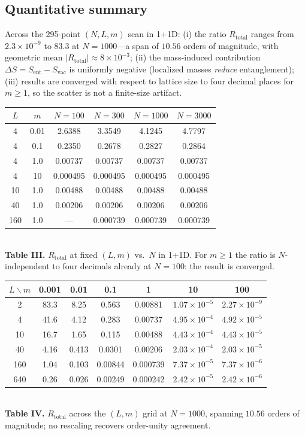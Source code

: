\documentclass[11pt]{article}
\newcommand{\Sent}{S_{\mathrm{ent}}}
\newcommand{\Svac}{S_{\mathrm{vac}}}
\newcommand{\Rtot}{R_{\mathrm{total}}}
\begin{document}
\subsection{Quantitative summary}
Across the 295-point $(N,L,m)$ scan in 1+1D: (i) the ratio $\Rtot$ ranges from $2.3\times 10^{-9}$ to
$83.3$ at $N=1000$---a span of $10.56$ orders of magnitude, with geometric mean $|\Rtot|\approx
8\times 10^{-3}$; (ii) the mass-induced contribution $\Delta S = \Sent - \Svac$ is uniformly negative
(localized masses \emph{reduce} entanglement); (iii) results are converged with respect to lattice size
to four decimal places for $m\ge 1$, so the scatter is not a finite-size artifact.
\begin{center}
\begin{tabular}{cccccc}
\toprule
$L$ & $m$ & $N=100$ & $N=300$ & $N=1000$ & $N=3000$ \\
\midrule
4   & 0.01 & 2.6388 & 3.3549 & 4.1245 & 4.7797 \\
4   & 0.1  & 0.2350 & 0.2678 & 0.2827 & 0.2864 \\
4   & 1.0  & 0.00737 & 0.00737 & 0.00737 & 0.00737 \\
4   & 10   & 0.000495 & 0.000495 & 0.000495 & 0.000495 \\
10  & 1.0  & 0.00488 & 0.00488 & 0.00488 & 0.00488 \\
40  & 1.0  & 0.00206 & 0.00206 & 0.00206 & 0.00206 \\
160 & 1.0  & --- & 0.000739 & 0.000739 & 0.000739 \\
\bottomrule
\end{tabular}
\\[2pt]
{\small \textbf{Table III.} $\Rtot$ at fixed $(L,m)$ vs.\ $N$ in 1+1D. For $m\ge 1$ the ratio is
$N$-independent to four decimals already at $N=100$: the result is converged.}
\end{center}
\begin{center}
\begin{tabular}{ccccccc}
\toprule
$L\backslash m$ & 0.001 & 0.01 & 0.1 & 1 & 10 & 100 \\
\midrule
2   & 83.3 & 8.25 & 0.563 & 0.00881 & $1.07{\times}10^{-5}$ & $2.27{\times}10^{-9}$ \\
4   & 41.6 & 4.12 & 0.283 & 0.00737 & $4.95{\times}10^{-4}$ & $4.92{\times}10^{-5}$ \\
10  & 16.7 & 1.65 & 0.115 & 0.00488 & $4.43{\times}10^{-4}$ & $4.43{\times}10^{-5}$ \\
40  & 4.16 & 0.413 & 0.0301 & 0.00206 & $2.03{\times}10^{-4}$ & $2.03{\times}10^{-5}$ \\
160 & 1.04 & 0.103 & 0.00844 & 0.000739 & $7.37{\times}10^{-5}$ & $7.37{\times}10^{-6}$ \\
640 & 0.26 & 0.026 & 0.00249 & 0.000242 & $2.42{\times}10^{-5}$ & $2.42{\times}10^{-6}$ \\
\bottomrule
\end{tabular}
\\[2pt]
{\small \textbf{Table IV.} $\Rtot$ across the $(L,m)$ grid at $N=1000$, spanning $10.56$ orders of
magnitude; no rescaling recovers order-unity agreement.}
\end{center}
\end{document}
